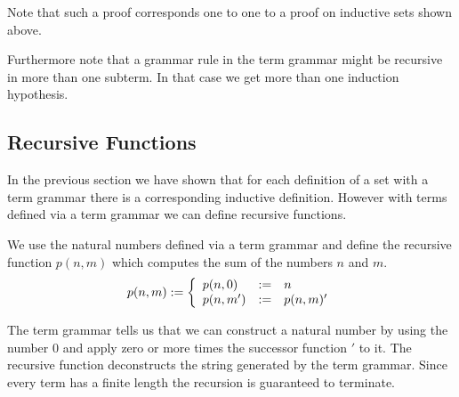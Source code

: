 Note that such a proof corresponds one to one to a proof on inductive sets shown
above.

Furthermore note that a grammar rule in the term grammar might be recursive in
more than one subterm. In that case we get more than one induction hypothesis.




\subsection{Recursive Functions}

In the previous section we have shown that for each definition of a set with a
term grammar there is a corresponding inductive definition. However with terms
defined via a term grammar we can define recursive functions.

We use the natural numbers defined via a term grammar and define the recursive
function $p(n,m)$ which computes the sum of the numbers $n$ and $m$.
$$
p(n,m) := \left\{ \begin{array}{llll} 
    p(n,0)  &:=& n
    \\
    p(n,m') &:=& p(n,m)'
 \end{array} \right.
$$

The term grammar tells us that we can construct a natural number by using the
number $0$ and apply zero or more times the successor function $'$ to it. The
recursive function deconstructs the string generated by the term grammar. Since
every term has a finite length the recursion is guaranteed to terminate.
